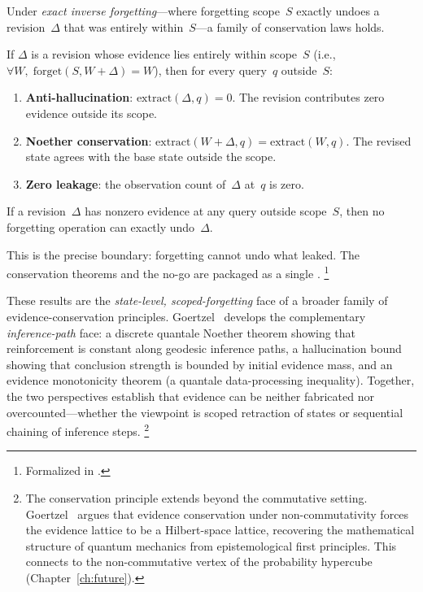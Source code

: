 \documentclass[11pt,openany]{report}
\begin{document}
Under \emph{exact inverse forgetting}---where forgetting scope~$S$
exactly undoes a revision~$\Delta$ that was entirely within~$S$---a
family of conservation laws holds.

\begin{theorem}
\label{thm:conservation}
If $\Delta$ is a revision whose evidence lies entirely within scope~$S$
(i.e., $\forall W,\; \mathrm{forget}(S, W + \Delta) = W$), then for
every query~$q$ outside~$S$:
\begin{enumerate}
\item \textbf{Anti-hallucination}: $\mathrm{extract}(\Delta, q) = 0$.
  The revision contributes zero evidence outside its scope.
\item \textbf{Noether conservation}:
  $\mathrm{extract}(W + \Delta, q) = \mathrm{extract}(W, q)$.
  The revised state agrees with the base state outside the scope.
\item \textbf{Zero leakage}: the observation count of~$\Delta$ at~$q$
  is zero.
\end{enumerate}
\end{theorem}

\begin{theorem}
If a revision~$\Delta$ has nonzero evidence at any query outside
scope~$S$, then no forgetting operation can exactly undo~$\Delta$.
\end{theorem}

\noindent
This is the precise boundary: forgetting cannot undo what leaked.
The conservation theorems and the no-go are packaged as a single
.%
\footnote{Formalized in
.}

These results are the \emph{state-level, scoped-forgetting} face of
a broader family of evidence-conservation principles.
Goertzel~\cite{GoertzelEvidenceConservation2026} develops the
complementary \emph{inference-path} face: a discrete quantale Noether
theorem showing that reinforcement is constant along geodesic
inference paths, a hallucination bound showing that conclusion
strength is bounded by initial evidence mass, and an evidence
monotonicity theorem (a quantale data-processing inequality).
Together, the two perspectives establish that evidence can be neither
fabricated nor overcounted---whether the viewpoint is scoped
retraction of states or sequential chaining of inference steps.%
\footnote{The conservation principle extends beyond the commutative
setting.  Goertzel~\cite{GoertzelQMEvidence2026} argues that
evidence conservation under non-commutativity forces the evidence
lattice to be a Hilbert-space lattice, recovering the mathematical
structure of quantum mechanics from epistemological first principles.
This connects to the non-commutative vertex of the probability
hypercube (Chapter~\ref{ch:future}).}
\end{document}

